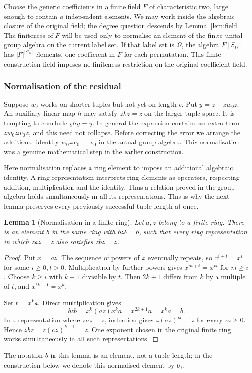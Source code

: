 \documentclass[11pt,a4paper]{article}
\newtheorem{lemma}[theorem]{Lemma}
\theoremstyle{definition}\newtheorem{definition}[theorem]{Definition}
\theoremstyle{remark}\newtheorem{remark}[theorem]{Remark}
\begin{document}
Choose the generic coefficients in a finite field $F$ of characteristic two, large enough to contain $a$ independent elements. We may work inside the algebraic closure of the original field; the degree question descends by Lemma~\ref{lem:field}. The finiteness of $F$ will be used only to normalise an element of the finite unital group algebra on the current label set.
If that label set is $\Omega$, the algebra $F[S_\Omega]$ has
$|F|^{|S_\Omega|}$ elements, one coefficient in $F$ for each
permutation. This finite construction field imposes no finiteness
restriction on the original coefficient field.

\subsubsection{Normalisation of the residual}
Suppose $w_0$ works on shorter tuples but not yet on length $b$. Put $y=z-zw_0z$. An auxiliary linear map $h$ may satisfy $zhz=z$ on the larger tuple space. It is tempting to conclude $yhy=y$. In general the expansion contains an extra term $zw_0zw_0z$, and this need not collapse. Before correcting the error we arrange the additional identity $w_0zw_0=w_0$ in the actual group algebra. This normalisation was a genuine mathematical step in the earlier construction.

Here normalisation replaces a ring element to impose an additional
algebraic identity. A ring representation interprets ring elements as operators,
respecting addition, multiplication and the identity. Thus a relation
proved in the group algebra holds simultaneously in all its
representations. This is why the next lemma preserves every previously
successful tuple length at once.

\begin{lemma}[Normalisation in a finite ring]\label{lem:normal}
Let $a,z$ belong to a finite ring. There is an element $b$ in the same ring with $bzb=b$, such that every ring representation in which $zaz=z$ also satisfies $zbz=z$.
\end{lemma}
\begin{proof}
Put $x=az$. The sequence of powers of $x$ eventually repeats, so $x^{i+t}=x^i$ for some $i\ge0,t>0$. Multiplication by further powers gives $x^{m+t}=x^m$ for $m\ge i$. Choose $k\ge i$ with $k+1$ divisible by $t$. Then $2k+1$ differs from $k$ by a multiple of $t$, and $x^{2k+1}=x^k$.

Set $b=x^ka$. Direct multiplication gives
\[bzb=x^k(az)x^ka=x^{2k+1}a=x^ka=b.\]
In a representation where $zaz=z$, induction gives $z(az)^m=z$ for every $m\ge0$. Hence $zbz=z(az)^{k+1}=z$. One exponent chosen in the original finite ring works simultaneously in all such representations.
\end{proof}
The notation $b$ in this lemma is an element, not a tuple length; in the construction below we denote this normalised element by $b_0$.
\end{document}
